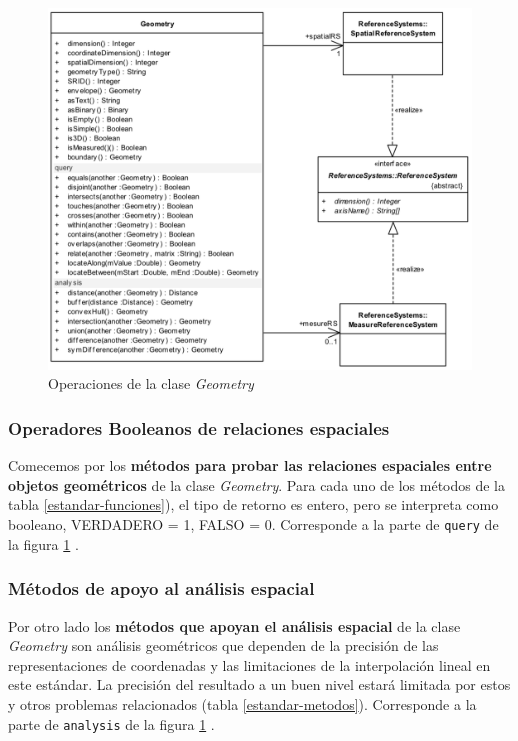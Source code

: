 \begin{figure}[H]
	\centering
	\includegraphics[width=1\linewidth]{imagenes/capitulo4/geometry-class}
	\caption{Operaciones de la clase \textit{Geometry} \cite{estandar}}
	\label{fig:geometry-class}
\end{figure}

\subsubsection{Operadores Booleanos de relaciones espaciales}

Comecemos por los \textbf{métodos para probar las relaciones espaciales entre objetos geométricos} de la clase \textit{Geometry}. Para cada uno de los métodos de la tabla \ref{estandar-funciones}), el tipo de retorno es entero, pero se interpreta como booleano, VERDADERO = 1, FALSO = 0. Corresponde a la parte de \texttt{query} de la figura \ref{fig:geometry-class} \cite{estandar, wkt-database}.



\subsubsection{Métodos de apoyo al análisis espacial}

Por otro lado los \textbf{métodos que apoyan el análisis espacial} de la clase \textit{Geometry} son análisis geométricos que dependen de la precisión de las representaciones de coordenadas y las limitaciones de la interpolación lineal en este estándar. La precisión del resultado a un buen nivel estará limitada por estos y otros problemas relacionados (tabla \ref{estandar-metodos}). Corresponde a la parte de \texttt{analysis} de la figura \ref{fig:geometry-class} \cite{estandar}.
 

